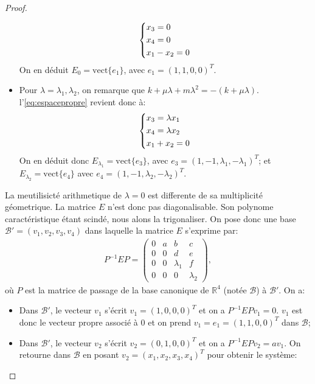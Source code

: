 \begin{proof}
\begin{itemize}
\begin{align*}
        \begin{dcases}            
        x_3 = 0 \\
        x_4 = 0 \\
        x_1 - x_2 = 0
        \end{dcases}
    \end{align*} 
    On en déduit $E_0 = \text{vect}\{ e_1 \}$, avec $e_1 = (1,1,0,0)^T$.
    \item Pour $\lambda = \lambda_1, \lambda_2$, on remarque que $k + \mu \lambda + m \lambda^2 = - (k + \mu \lambda)$. l'\cref{eq:espacepropre} revient donc à:
    \begin{align*}
        \begin{dcases}            
        x_3 = \lambda x_1 \\
        x_4 = \lambda x_2 \\
        x_1 + x_2 = 0
        \end{dcases}
    \end{align*} 
    On en déduit donc $E_{\lambda_1} = \text{vect}\{ e_3 \}$, avec $e_3 = (1,-1,\lambda_1,-\lambda_1)^T$; et $E_{\lambda_2} = \text{vect}\{ e_4 \}$ avec $e_4 = (1,-1,\lambda_2,-\lambda_2)^T$.
\end{itemize}
La meutilisicté arithmetique de $\lambda = 0$ est differente de sa multiplicité géometrique. La matrice $E$ n'est donc pas diagonalisable. Son polynome caractéristique étant scindé, nous alons la trigonaliser. On pose donc une base $\mathcal{B}' = (v_1, v_2, v_3, v_4)$ dans laquelle la matrice $E$ s'exprime par:
\begin{align*}
    P^{-1}EP = \begin{pmatrix}
        0 & a & b & c \\ 0 & 0 & d & e \\ 0 & 0 & \lambda_1 & f \\ 0 & 0 & 0 & \lambda_2
    \end{pmatrix},
\end{align*}
où $P$ est la matrice de passage de la base canonique de $\mathbb{R}^4$ (notée $\mathcal{B}$) à $\mathcal{B}'$. On a:
\begin{itemize}
    \item Dans $\mathcal{B}'$, le vecteur $v_1$ s'écrit $v_1 = (1,0,0,0)^T$ et on a $P^{-1}EP v_1 = 0$. $v_1$ est donc le vecteur propre associé à $0$ et on prend $v_1 = e_1 = (1,1,0,0)^T$ dans $\mathcal{B}$;
    \item Dans $\mathcal{B}'$, le vecteur $v_2$ s'écrit $v_2 = (0,1,0,0)^T$ et on a $P^{-1}EP v_2 = a v_1$. On retourne dans $\mathcal{B}$ en posant $v_2 = (x_1, x_2, x_3, x_4)^T$ pour obtenir le système:

\end{itemize}
\end{proof}
